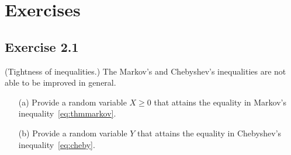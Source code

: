 \documentclass[11pt]{article}
\theoremstyle{plain}
\theoremstyle{definition}
\begin{document}
\section{Exercises}

\subsection{Exercise 2.1} (Tightness of inequalities.) The Markov's and Chebyshev's inequalities are not able to be improved in general. 
\begin{enumerate}
	\item[(a)] Provide a random variable $X \geq 0$ that attains the equality in Markov's inequality~\eqref{eq:thmmarkov}.  
	\item[(b)] Provide a random variable $Y$ that attains the equality in Chebyshev's inequality~\eqref{eq:cheby}.  
\end{enumerate}
\end{document}
